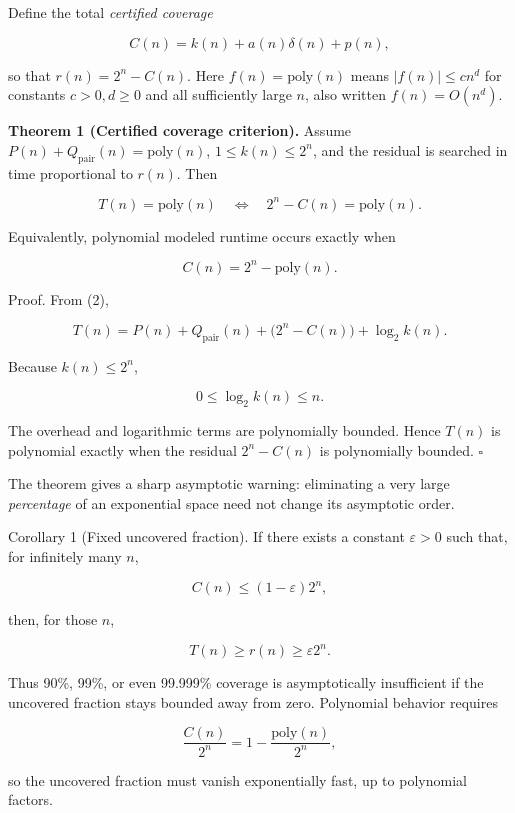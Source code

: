 \documentclass[
  10pt,
  english,
]{article}
\begin{document}
Define the total \emph{certified coverage}

\[
C(n) = k(n) + a(n)\delta(n) + p(n),
\]

so that \(r(n) = 2^n - C(n)\). Here \(f(n)=\mathrm{poly}(n)\) means
\(|f(n)|\le c n^d\) for constants \(c>0,d\ge0\) and all sufficiently large
\(n\), also written \(f(n)=O(n^d)\).

\begin{tcolorbox}[accentbox]
\textbf{Theorem 1 (Certified coverage criterion).} Assume
\(P(n)+Q_{\mathrm{pair}}(n) = \mathrm{poly}(n)\),
\(1 \le k(n) \le 2^n\), and the residual is searched in time
proportional to \(r(n)\). Then

\[
  T(n) = \mathrm{poly}(n) \quad\Longleftrightarrow\quad 2^n - C(n) = \mathrm{poly}(n).
  \]

Equivalently, polynomial modeled runtime occurs exactly when

\[
  C(n) = 2^n - \mathrm{poly}(n).
  \]
\end{tcolorbox}

{Proof.} From (2),

\[
  T(n) = P(n) + Q_{\mathrm{pair}}(n) + \bigl(2^n - C(n)\bigr) + \log_2 k(n).
  \]

Because \(k(n) \le 2^n\),

\[
  0 \le \log_2 k(n) \le n.
  \]

The overhead and logarithmic terms are polynomially bounded. Hence
\(T(n)\) is polynomial exactly when the residual \(2^n - C(n)\) is
polynomially bounded. \hfill $\square$

The theorem gives a sharp asymptotic warning: eliminating a very large
\emph{percentage} of an exponential space need not change its asymptotic
order.

{Corollary 1 (Fixed uncovered fraction).} If there exists a constant
\(\varepsilon > 0\) such that, for infinitely many \(n\),

\[
  C(n) \le (1-\varepsilon)2^n,
  \]

then, for those \(n\),

\[
  T(n) \ge r(n) \ge \varepsilon 2^n.
  \]

Thus 90\%, 99\%, or even 99.999\% coverage is asymptotically
insufficient if the uncovered fraction stays bounded away from zero.
Polynomial behavior requires

\[
\frac{C(n)}{2^n} = 1 - \frac{\mathrm{poly}(n)}{2^n},
\]

so the uncovered fraction must vanish exponentially fast, up to
polynomial factors.
\end{document}
